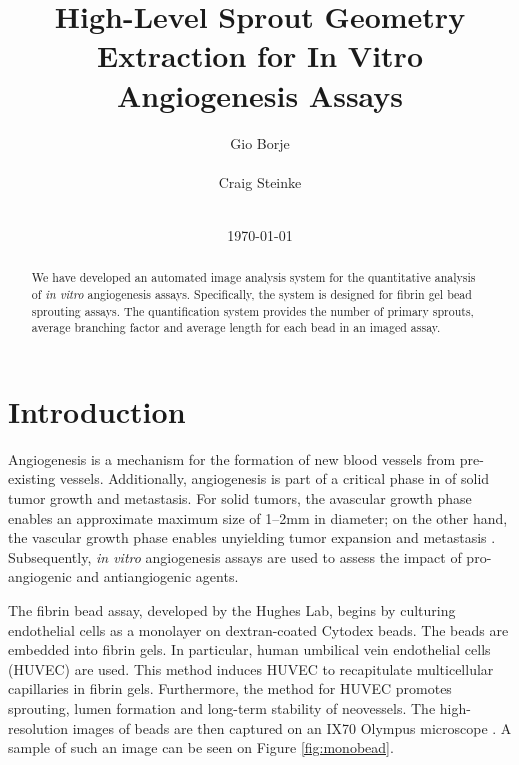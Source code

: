 \documentclass{sig-alternate}
\newcommand{\invitro}{\emph{in vitro} }
\begin{document}
\title{High-Level Sprout Geometry Extraction for In Vitro Angiogenesis Assays}
\author{
	\alignauthor Gio Borje \\
		 \\
	\alignauthor Craig Steinke \\
		 \\
}
\date{\today}
\maketitle

\begin{abstract}
	We have developed an automated image analysis system for the quantitative
	analysis of \invitro angiogenesis assays. Specifically, the system is
	designed for fibrin gel bead sprouting assays. The quantification system
	provides the number of primary sprouts, average branching factor and
	average length for each bead in an imaged assay.
\end{abstract}

\section{Introduction} %
\label{sec:Introduction}
	Angiogenesis is a mechanism for the formation of new blood vessels from
	pre-existing vessels. Additionally, angiogenesis is part of a critical
	phase in of solid tumor growth and metastasis. For solid tumors, the
	avascular growth phase enables an approximate maximum size of 1--2mm in
	diameter; on the other hand, the vascular growth phase enables unyielding
	tumor expansion and metastasis \cite{kerbel99}. Subsequently, \invitro
	angiogenesis assays are used to assess the impact of pro-angiogenic and
	antiangiogenic agents.

	The fibrin bead assay, developed by the Hughes Lab, begins by culturing
	endothelial cells as a monolayer on dextran-coated Cytodex beads. The
	beads are embedded into fibrin gels. In particular, human umbilical vein
	endothelial cells (HUVEC) are used. This method induces HUVEC to
	recapitulate multicellular capillaries in fibrin gels. Furthermore, the
	method for HUVEC promotes sprouting, lumen formation and long-term
	stability of neovessels. The high-resolution images of beads are then
	captured on an IX70 Olympus microscope \cite{nakatsu03}. A sample of such
	an image can be seen on Figure \ref{fig:monobead}.
\end{document}
